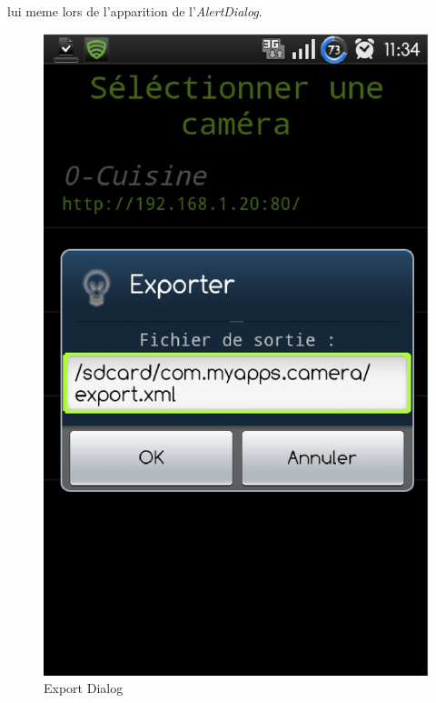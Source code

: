 lui meme lors de l'apparition de l'\textit{AlertDialog}.
\begin{figure}[H]
  \label{export}
  \centering
   \includegraphics[scale=0.4]{Images/export.eps}
  \caption{Export Dialog}
\end{figure}  

